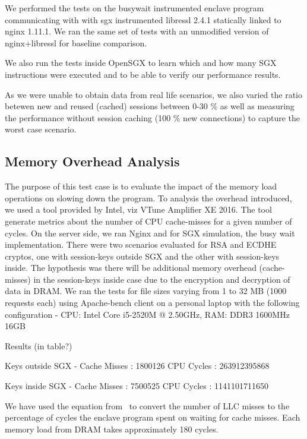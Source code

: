 \documentclass[../main.tex]{subfiles}
\begin{document}
We performed the tests on the busywait instrumented enclave program
communicating with with sgx instrumented libressl 2.4.1 statically
linked to nginx 1.11.1. We ran the same set of tests with an
unmodified version of nginx+libressl for baseline comparison.

We also run the tests inside OpenSGX to learn which and how many SGX
instructions were executed and to be able to verify our performance
results.

As we were unable to obtain data from real life scenarios, we also
varied the ratio betewen new and reused (cached) sessions between 0-30
\% as well as measuring the performance without session caching (100
\% new connections) to capture the worst case scenario.

\subsection{Memory Overhead Analysis}
The purpose of this test case is to evaluate the impact of the memory
load operations on slowing down the program. To analysis the overhead
introduced, we used a tool provided by Intel, viz VTune Amplifier XE
2016. The tool generate metrics about the number of CPU cache-misses
for a given number of cycles. On the server side, we ran Nginx and for
SGX simulation, the busy wait implementation. There were two scenarios
evaluated for RSA and ECDHE cryptos, one with session-keys outside SGX
and the other with session-keys inside. The hypothesis was there will
be additional memory overhead (cache-misses) in the session-keys
inside case due to the encryption and decryption of data in DRAM. We
ran the tests for file sizes varying from 1 to 32 MB (1000 requests
each) using Apache-bench client on a personal laptop with the
following configuration - CPU: Intel Core i5-2520M @ 2.50GHz, RAM:
DDR3 1600MHz 16GB

Results (in table?)


Keys outside SGX - Cache Misses : 1800126 CPU Cycles : 263912395868

Keys inside SGX - Cache Misses : 7500525 CPU Cycles : 1141101711650

\begin{table}[H]
\end{table}

We have used the equation from \Intel~to convert the number of LLC misses to
the percentage of cycles the enclave program spent on waiting for
cache misses. Each memory load from DRAM takes approximately 180
cycles.
\end{document}
